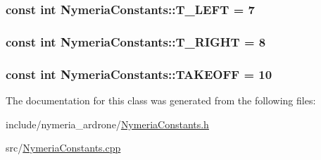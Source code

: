 \subsubsection[{T\+\_\+\+L\+E\+F\+T}]{\setlength{\rightskip}{0pt plus 5cm}const int Nymeria\+Constants\+::\+T\+\_\+\+L\+E\+F\+T = 7\hspace{0.3cm}{\ttfamily [static]}}\label{class_nymeria_constants_a78d3f41faf6972cfff257bd489d7f446}
\hypertarget{class_nymeria_constants_aaec5867264b2ad1c8a62fa96aaf532fe}{}
\subsubsection[{T\+\_\+\+R\+I\+G\+H\+T}]{\setlength{\rightskip}{0pt plus 5cm}const int Nymeria\+Constants\+::\+T\+\_\+\+R\+I\+G\+H\+T = 8\hspace{0.3cm}{\ttfamily [static]}}\label{class_nymeria_constants_aaec5867264b2ad1c8a62fa96aaf532fe}
\hypertarget{class_nymeria_constants_ac891f5554d1e296582a583c20e956e51}{}
\subsubsection[{T\+A\+K\+E\+O\+F\+F}]{\setlength{\rightskip}{0pt plus 5cm}const int Nymeria\+Constants\+::\+T\+A\+K\+E\+O\+F\+F = 10\hspace{0.3cm}{\ttfamily [static]}}\label{class_nymeria_constants_ac891f5554d1e296582a583c20e956e51}


The documentation for this class was generated from the following files\+:\begin{DoxyCompactItemize}
\item 
include/nymeria\+\_\+ardrone/\hyperlink{_nymeria_constants_8h}{Nymeria\+Constants.\+h}\item 
src/\hyperlink{_nymeria_constants_8cpp}{Nymeria\+Constants.\+cpp}\end{DoxyCompactItemize}
